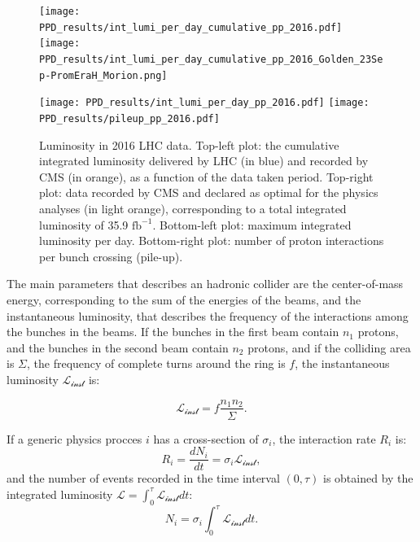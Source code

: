 \begin{figure}[!htb]
  \centering
    \texttt{[image: PPD\_results/int\_lumi\_per\_day\_cumulative\_pp\_2016.pdf]}%
    \texttt{[image: PPD\_results/int\_lumi\_per\_day\_cumulative\_pp\_2016\_Golden\_23Sep-PromEraH\_Morion.png]}

    \texttt{[image: PPD\_results/int\_lumi\_per\_day\_pp\_2016.pdf]}%
    \texttt{[image: PPD\_results/pileup\_pp\_2016.pdf]}

  \caption{Luminosity in 2016 LHC data. Top-left plot: the cumulative integrated luminosity delivered by LHC (in blue) and recorded by CMS (in orange), as a function of the data taken period. Top-right plot: data recorded by CMS and declared as optimal for the physics analyses (in light orange), corresponding to a total integrated luminosity of 35.9 $\text{fb}^{-1}$. Bottom-left plot: maximum integrated luminosity per day. Bottom-right plot: number of proton interactions per bunch crossing (pile-up).}
  \label{fig:LHC_lumi}
\end{figure}

\noindent The main parameters that describes an hadronic collider are the center-of-mass energy, corresponding to the sum of the energies of the beams, and the instantaneous luminosity, that describes the frequency of the interactions among the bunches in the beams. If the bunches in the first beam contain $n_1$ protons, and the bunches in the second beam contain $n_2$ protons, and if the colliding area is $\Sigma$, the frequency of complete turns
around the ring is $f$, the instantaneous luminosity $\mathcal{L_{\text{inst}}}$ is:

\begin{equation}
\mathcal{L_{\text{inst}}} = f \frac{n_1 n_2}{\Sigma}.
\label{eq:LHC_luminosity_def}
\end{equation}

\noindent If a generic physics procces $i$ has a cross-section of $\sigma_i$, the interaction rate $R_i$ is:
\begin{equation}
R_i = \frac{dN_i}{dt}= \sigma_i \mathcal{L_{\text{inst}}},
\label{eq:LHC_interaction_rate}
\end{equation}
and the number of events recorded in the time interval $(0,\tau)$ is obtained by the integrated luminosity $\mathcal{L} = \int_0^{\tau} \mathcal{L_{\text{inst}}} dt$:
\begin{equation}
N_i = \sigma_i \int_0^{\tau} \mathcal{L_{\text{inst}}} dt.
\end{equation}


